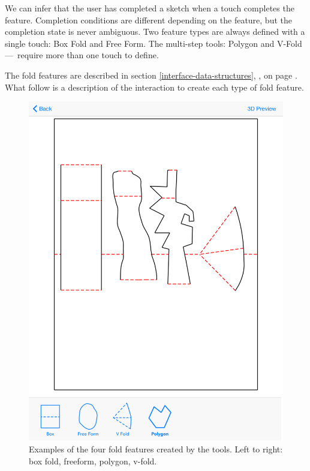 We can infer that the user has completed a sketch when a touch completes
the feature. Completion conditions are different depending on the
feature, but the completion state is never ambiguous. Two feature types
are always defined with a single touch: Box Fold and Free Form. The
multi-step tools: Polygon and V-Fold ---~require more than one touch to
define.

The fold features are described in section
\ref{interface-data-structures}, , on
page \pageref{interface-data-structures}. What follow is a description
of the interaction to create each type of fold feature.

\begin{figure}[htbp]
\centering
\includegraphics{figures/32_UI_Tool_Interactions/foldFeatures.png}
\caption{Examples of the four fold features created by the tools. Left
to right: box fold, freeform, polygon, v-fold.}
\end{figure}


